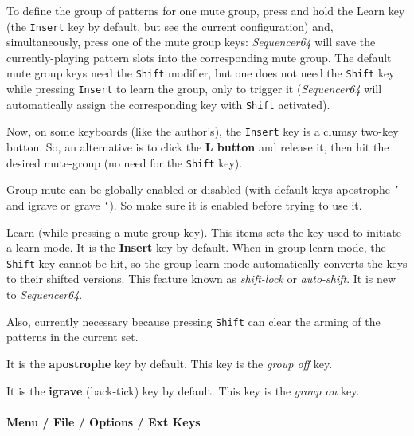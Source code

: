    To define the group of patterns for one mute group, press and hold the Learn
   key (the \texttt{Insert} key by default, but see the current configuration)
   and, simultaneously, press one of the mute group keys: \textsl{Sequencer64}
   will save the currently-playing pattern slots into the corresponding mute
   group.  The default mute group keys need the \texttt{Shift}
   modifier, but one does not need the \texttt{Shift} key while pressing
   \texttt{Insert} to learn the group, only to trigger it
   (\textsl{Sequencer64} will automatically assign the corresponding key with
   \texttt{Shift} activated).

   Now, on some keyboards (like the author's), 
   the \texttt{Insert} key is a clumsy two-key button.  So, an alternative
   is to click the  \textbf{L button} and release it,
   then hit the desired mute-group (no need for the \texttt{Shift} key).

   Group-mute can be globally enabled or disabled (with default keys apostrophe
   \texttt{'}   and igrave or grave \texttt{`}).
   So make sure it is enabled before trying to use it.

   Learn (while pressing a mute-group key).
   This items sets the key used to initiate a learn mode.
   It is the \textbf{Insert} key by default.
   When in group-learn mode, the \texttt{Shift} key cannot be hit, so the
   group-learn mode automatically converts the keys to their shifted versions.
   This feature known as \textsl{shift-lock} or \textsl{auto-shift}.
   It is new to \textsl{Sequencer64}.

   Also, currently necessary because pressing \texttt{Shift} can clear the
   arming of the patterns in the current set.

   It is the \textbf{apostrophe} key by default.
   This key is the \textsl{group off} key.

   It is the \textbf{igrave} (back-tick) key by default.
   This key is the \textsl{group on} key.

\paragraph{Menu / File / Options / Ext Keys }
\label{paragraph:seq64_menu_file_options_ext_keys}


